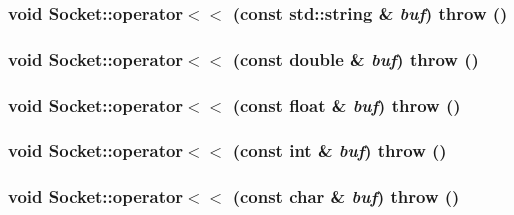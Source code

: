 \hypertarget{classSocket_5bcc8d8ed10662161b8c3e07f9c31421}{
\subsubsection[{operator$<$$<$}]{\setlength{\rightskip}{0pt plus 5cm}void Socket::operator$<$$<$ (const std::string \& {\em buf})  throw ()}}
\label{classSocket_5bcc8d8ed10662161b8c3e07f9c31421}


\hypertarget{classSocket_41b423cfc8d93f8a66de428f8699cdd7}{
\subsubsection[{operator$<$$<$}]{\setlength{\rightskip}{0pt plus 5cm}void Socket::operator$<$$<$ (const double \& {\em buf})  throw ()}}
\label{classSocket_41b423cfc8d93f8a66de428f8699cdd7}


\hypertarget{classSocket_6ea159d9fa113f2e9f5a01f2e29fb295}{
\subsubsection[{operator$<$$<$}]{\setlength{\rightskip}{0pt plus 5cm}void Socket::operator$<$$<$ (const float \& {\em buf})  throw ()}}
\label{classSocket_6ea159d9fa113f2e9f5a01f2e29fb295}


\hypertarget{classSocket_517cbbbff8acd1aff6d8175559bc531f}{
\subsubsection[{operator$<$$<$}]{\setlength{\rightskip}{0pt plus 5cm}void Socket::operator$<$$<$ (const int \& {\em buf})  throw ()}}
\label{classSocket_517cbbbff8acd1aff6d8175559bc531f}


\hypertarget{classSocket_0980ddfd4e759553b20e5e517f2f9fc2}{
\subsubsection[{operator$<$$<$}]{\setlength{\rightskip}{0pt plus 5cm}void Socket::operator$<$$<$ (const char \& {\em buf})  throw ()}}
\label{classSocket_0980ddfd4e759553b20e5e517f2f9fc2}


